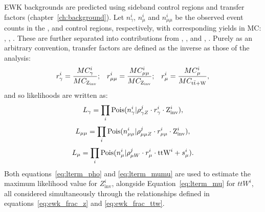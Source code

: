 EWK backgrounds are predicted using sideband control regions and transfer 
factors (chapter~\ref{ch:background}). Let $n_{\gamma}^i$, $n_{\mu}^i$ and
$n_{\mu\mu}^i$ be
the observed event counts in the \gj, \mj and \mmj control regions, 
respectively, with corresponding yields in MC: \mcp, \mcm, \mcmm. These are
further separated into contributions from \zinv, \mczinv, and ,
\mcttw. Purely as an arbitrary convention, transfer factors are defined as
the inverse as those of the analysis:
% 
\begin{equation}
r_{\gamma}^i = \frac{MC_{\gamma}^i}{MC_{\text{Z}_{\text{inv}}}};\;\;\;
r_{\mu\mu}^i = \frac{MC_{\mu\mu}^i}{MC_{\text{Z}_{\text{inv}}}};\;\;\;
r_{\mu}^i = \frac{MC_{\mu}^i}{MC_{\rm{t}\bar{\rm{t}}+\text{W}}},
\end{equation}
% 
and so likelihoods are written as:
% 
\begin{equation}
L_{\gamma} = \prod_i \text{Pois}(n_{\gamma}^i | \rho^j_{\gamma Z} \cdot r^i_{\gamma} \cdot \text{Z}^i_{\text{inv}}),
\label{eq:lterm_pho}
\end{equation}
\begin{equation}
L_{\mu\mu} = \prod_i \text{Pois}(n_{\mu\mu}^i | \rho^j_{\mu\mu Z} \cdot r^i_{\mu\mu} \cdot \text{Z}^i_{\text{inv}}),
\label{eq:lterm_mumu}
\end{equation}
\begin{equation}
L_{\mu} = \prod_i \text{Pois}(n_{\mu}^i | \rho^j_{\mu W} \cdot r^i_{\mu} \cdot \text{ttW}^i + s_{\mu}^i).
\label{eq:lterm_mu}
\end{equation}
% 
Both equations~\ref{eq:lterm_pho} and \ref{eq:lterm_mumu} are used to estimate the 
maximum likelihood value for $Z^i_{\text{inv}}$, alongside Equation~\ref{eq:lterm_mu} 
for $ttW^i$, all considered simultaneously through the relationships defined in
equations~\ref{eq:ewk_frac_z} and \ref{eq:ewk_frac_ttw}.

